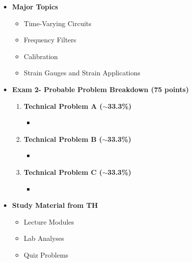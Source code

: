 \documentclass[11pt]{article}
\newcommand{\EXAMNUM}{2\hspace{0mm}}
\begin{document}
\begin{itemize}
\newpage

\item\textbf{\Large Major Topics}\\
	\begin{itemize}

	\item {\large Time-Varying Circuits}
	
	\item {\large Frequency Filters}

	\item {\large Calibration}
	
	\item {\large Strain Gauges and Strain Applications}

	\end{itemize}


%
\item  \textbf{\Large Exam \EXAMNUM  - Probable Problem Breakdown (75 points) }\\
\Large
	\begin{enumerate}


		\item  \textbf{\Large Technical Problem A ($\sim$33.3\%)}\\
		\begin{itemize}
			\item 
		\end{itemize}
		\item  \textbf{\Large Technical Problem B ($\sim$33.3\%)}\\
		\begin{itemize}
			\item 
		\end{itemize}
		\item  \textbf{\Large Technical Problem C ($\sim$33.3\%)}\\
		\begin{itemize}
			\item 

		\end{itemize}

	\end{enumerate}

\item  \textbf{\Large Study Material from TH}\\
\begin{itemize}

\item Lecture Modules

\item Lab Analyses 

\item Quiz Problems

\end{itemize}




\end{itemize}


	
\end{document}
